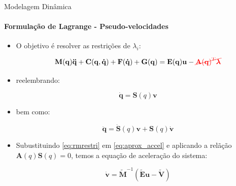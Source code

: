 \documentclass{beamer}
\begin{document}
\begin{frame}{Modelagem Dinâmica}
    \framesubtitle{Formulação de Lagrange - Pseudo-velocidades}

    \begin{itemize}
        \item O objetivo é resolver as restrições de $\lambda_i$:

              \begin{equation}\label{eq:rmrestri}
                  \mathbf{M(q)\ddot{q}+ C(q, \dot{q})+ F(\dot{q})+G(q) = E(q)u} - \textcolor{red}{\cancel{\mathbf{A}\mathbf{(q)}^T\boldsymbol{\lambda}}}
              \end{equation}

        \item reelembrando:

              \begin{equation*}
                  \mathbf{\dot{q}} = \mathbf{S}(q)\mathbf{v}
              \end{equation*}

        \item bem como:

              \begin{equation}\label{eq:aprox_accel}
                  \mathbf{\ddot{q}} = \mathbf{\dot{S}}(q)\mathbf{v} + \mathbf{S}(q)\mathbf{\dot{v}}
              \end{equation}

        \item Subustituindo \eqref{eq:rmrestri} em \eqref{eq:aprox_accel} e aplicando a relãção $\mathbf{A}(q)\mathbf{S}(q)=0$, temos a equação de aceleração do sistema:

              \begin{equation}\label{eq:pseudovelo}
                  \mathbf{\dot{v}} = \mathbf{\tilde{M}}^{-1}\left(\mathbf{\tilde{E}u - \tilde{V}} \right)
              \end{equation}
    \end{itemize}
\end{frame}
\end{document}
